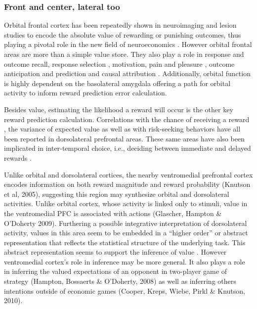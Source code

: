 \subsubsection{Front and center, lateral too}
\label{subsub:fclt}
Orbital frontal cortex has been repeatedly shown in neuroimaging \citep{ODoherty:2001p2423} and lesion \citep{Hornak:2004p6234} studies to encode the absolute value of rewarding or punishing outcomes, thus playing a pivotal role in the new field of neuroeconomics \citep{Glimcher:2005p863}.  However orbital frontal areas are more than a simple value store.  They also play a role in response and outcome recall, response selection \citep{Rudebeck:2008p4712, Furuyashiki:2008p1631}, motivation, pain and pleasure \citep{Atlas:2010p7566}, outcome anticipation and prediction \citep{Tanaka:2006fk, Roesch:2007p7182} and causal attribution \citep{Tanaka:2008p3265}.  Additionally, orbital function is highly dependent on the basolateral amygdala \citep{ODoherty:2003p2616} offering a path for orbital activity to inform reward prediction error calculation.  

Besides value, estimating the likelihood a reward will occur is the other key reward prediction calculation.  Correlations with the chance of receiving a reward \citep{Tobler:2009p8297}, the variance of expected value \citep{Kahnt:2010p7677} as well as with risk-seeking behaviors \citep{Tobler:2007p1562} have all been reported in dorsolateral prefrontal areas.  These same areas have also been implicated in inter-temporal choice, i.e., deciding between immediate and delayed rewards \citep{Kim:2009p8304,Kim:2008p2984}.

Unlike orbital and dorsolateral cortices, the nearby ventromedial prefrontal cortex encodes information on both reward magnitude and reward probability (Knutson et al, 2005), suggesting this region may synthesize orbital and dorsolateral activities.  Unlike orbital cortex, whose activity is linked only to stimuli, value in the ventromedial PFC is associated with actions (Glascher, Hampton \& O’Doherty 2009).   Furthering a possible integrative interpretation of dorsolateral activity, values in this area seem to be embedded in a ``higher order''  or abstract representation that reflects the statistical structure of the underlying task.  This abstract representation seems to support the inference of value \citep{Hampton:2006p2577}.  However ventromedial cortex's role in inference may be more general. It also plays a role in inferring the valued expectations of an opponent in two-player game of strategy (Hampton, Bossaerts \& O'Doherty, 2008) as well as inferring others intentions outside of economic games (Cooper, Kreps, Wiebe, Pirkl \& Knutson, 2010).

